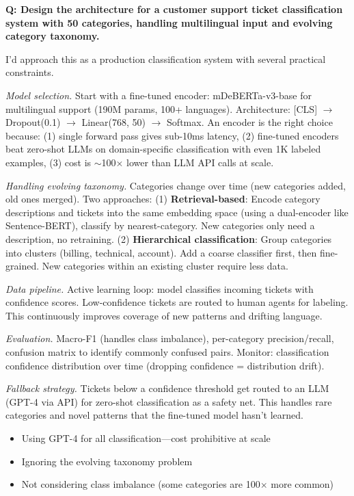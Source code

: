 \begin{interviewq}
\textbf{Q: Design the architecture for a customer support ticket classification system with 50 categories, handling multilingual input and evolving category taxonomy.}

 \quad {} \quad \badgefreq{\freqhigh}

\stronganswer I'd approach this as a production classification system with several practical constraints.

\textit{Model selection.} Start with a fine-tuned encoder: mDeBERTa-v3-base for multilingual support (190M params, 100+ languages). Architecture: [CLS] $\to$ Dropout(0.1) $\to$ Linear(768, 50) $\to$ Softmax. An encoder is the right choice because: (1) single forward pass gives sub-10ms latency, (2) fine-tuned encoders beat zero-shot LLMs on domain-specific classification with even 1K labeled examples, (3) cost is $\sim$100$\times$ lower than LLM API calls at scale.

\textit{Handling evolving taxonomy.} Categories change over time (new categories added, old ones merged). Two approaches: (1) \textbf{Retrieval-based}: Encode category descriptions and tickets into the same embedding space (using a dual-encoder like Sentence-BERT), classify by nearest-category. New categories only need a description, no retraining. (2) \textbf{Hierarchical classification}: Group categories into clusters (billing, technical, account). Add a coarse classifier first, then fine-grained. New categories within an existing cluster require less data.

\textit{Data pipeline.} Active learning loop: model classifies incoming tickets with confidence scores. Low-confidence tickets are routed to human agents for labeling. This continuously improves coverage of new patterns and drifting language.

\textit{Evaluation.} Macro-F1 (handles class imbalance), per-category precision/recall, confusion matrix to identify commonly confused pairs. Monitor: classification confidence distribution over time (dropping confidence = distribution drift).

\textit{Fallback strategy.} Tickets below a confidence threshold get routed to an LLM (GPT-4 via API) for zero-shot classification as a safety net. This handles rare categories and novel patterns that the fine-tuned model hasn't learned.

\redflags
\begin{itemize}
    \item Using GPT-4 for all classification---cost prohibitive at scale
    \item Ignoring the evolving taxonomy problem
    \item Not considering class imbalance (some categories are 100$\times$ more common)
\end{itemize}


\end{interviewq}

